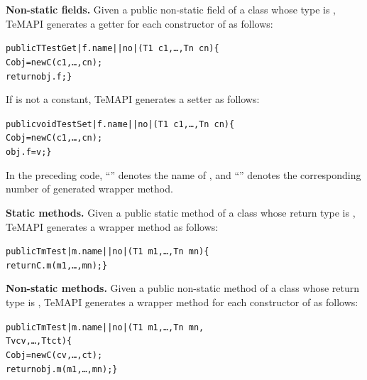 \textbf{Non-static fields.} Given a public non-static field  of a class  whose type is , TeMAPI generates a getter for each constructor  of  as follows:
\begin{CodeOut}%
\begin{alltt}
 public T TestGet|f.name||no|(T1\ c1,\ldots, Tn\ cn)\{
    C obj = new C(c1,\ldots, cn);
    return obj.f; \}
\end{alltt}
\end{CodeOut}

If  is not a constant, TeMAPI generates a setter as follows:
\begin{CodeOut}%
\begin{alltt}
 public void TestSet|f.name||no|(T1\ c1,\ldots, Tn\ cn)\{
   C obj = new C(c1,\ldots, cn);
   obj.f = v; \}
\end{alltt}
\end{CodeOut}

In the preceding code, ``'' denotes the name of , and ``'' denotes the corresponding number of generated wrapper method.

\textbf{Static methods.} Given a public static method  of a class  whose return type is , TeMAPI generates a wrapper method as follows:
\begin{CodeOut}%
\begin{alltt}
 public Tm Test|m.name||no|(T1\ m1,\ldots, Tn\ mn)\{
   return C.m(m1,\ldots, mn); \}
\end{alltt}
\end{CodeOut}

\textbf{Non-static methods.} Given a public non-static method  of a class  whose return type is , TeMAPI generates a wrapper method for each constructor  of  as follows:
\begin{CodeOut}%
\begin{alltt}
 public Tm Test|m.name||no|(T1\ m1,\ldots, Tn\ mn,
                            Tv cv, \ldots, Tt ct)\{
   C obj = new C(cv,\ldots, ct);
   return obj.m(m1,\ldots, mn); \}
\end{alltt}
\end{CodeOut}


